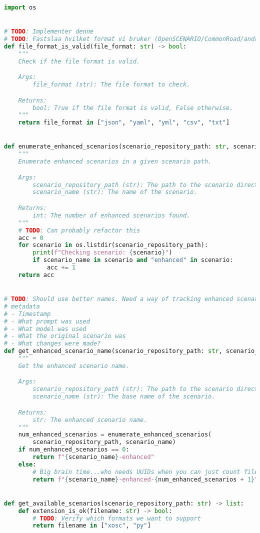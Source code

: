 \begin{lstlisting}[caption={scenario\_utils.py, The implementation of an various scenaro helper functions for executing prompts.}, label={lst:odinScenarioUtils}, language={Python}]
import os


# TODO: Implementer denne
# TODO: Fastslaa hvilket format vi bruker (OpenSCENARIO/CommonRoad/andre)
def file_format_is_valid(file_format: str) -> bool:
    """
    Check if the file format is valid.

    Args:
        file_format (str): The file format to check.

    Returns:
        bool: True if the file format is valid, False otherwise.
    """
    return file_format in ["json", "yaml", "yml", "csv", "txt"]


def enumerate_enhanced_scenarios(scenario_repository_path: str, scenario_name: str) -> int:
    """
    Enumerate enhanced scenarios in a given scenario path.

    Args:
        scenario_repository_path (str): The path to the scenario directory.
        scenario_name (str): The name of the scenario.

    Returns:
        int: The number of enhanced scenarios found.
    """
    # TODO: Can probably refactor this
    acc = 0
    for scenario in os.listdir(scenario_repository_path):
        print(f"Checking scenario: {scenario}")
        if scenario_name in scenario and "enhanced" in scenario:
            acc += 1
    return acc


# TODO: Should use better names. Need a way of tracking enhanced scenario
# metadata
# - Timestamp
# - What prompt was used
# - What model was used
# - What the original scenario was
# - What changes were made?
def get_enhanced_scenario_name(scenario_repository_path: str, scenario_name: str) -> str:
    """
    Get the enhanced scenario name.

    Args:
        scenario_repository_path (str): The path to the scenario directory.
        scenario_name (str): The base name of the scenario.

    Returns:
        str: The enhanced scenario name.
    """
    num_enhanced_scenarios = enumerate_enhanced_scenarios(
        scenario_repository_path, scenario_name)
    if num_enhanced_scenarios == 0:
        return f"{scenario_name}-enhanced"
    else:
        # Big brain time...who needs UUIDs when you can just count files?
        return f"{scenario_name}-enhanced-{num_enhanced_scenarios + 1}"


def get_available_scenarios(scenario_repository_path: str) -> list:
    def extension_is_ok(filename: str) -> bool:
        # TODO: Verify which formats we want to support
        return filename in ["xosc", "py"]


\end{lstlisting}
